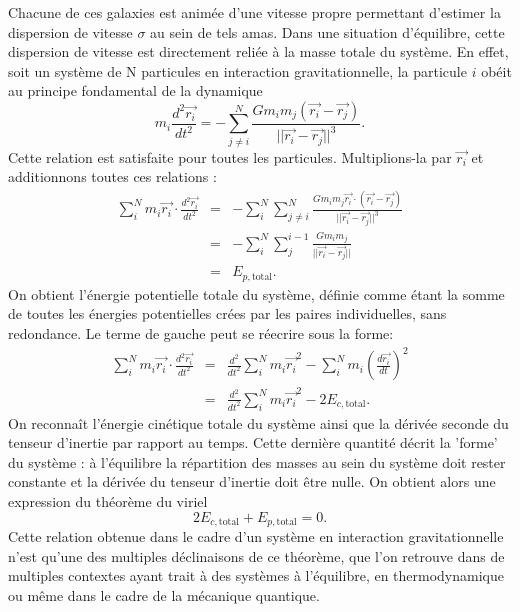 Chacune de ces galaxies est animée d'une vitesse propre permettant d'estimer la dispersion de vitesse $\sigma$ au sein de tels amas. Dans une situation d'équilibre, cette dispersion de vitesse est directement reliée à la masse totale du système. En effet, soit un système de N particules en interaction gravitationnelle, la particule $i$ obéit au principe fondamental de la dynamique
\begin{equation}
m_i\frac{d^2 \vec{r_i}}{dt^2}=-\sum_{j\neq i}^N \frac{Gm_i m_j (\vec{r_i}-\vec{r_j})}{||\vec{r_i}-\vec{r_j}||^3}.
\end{equation}
Cette relation est satisfaite pour toutes les particules. Multiplions-la par $\vec{r_i}$ et additionnons toutes ces relations :
\begin{eqnarray}
\sum_i^N m_i\vec{r_i}\cdot\frac{d^2 \vec{r_i}}{dt^2}&=&-\sum_i^N \sum_{j\neq i}^N \frac{Gm_i m_j \vec{r_i}\cdot (\vec{r_i}-\vec{r_j})}{||\vec{r_i}-\vec{r_j}||^3}\\
&=& -\sum_i^N \sum_j^{i-1}\frac{Gm_i m_j}{||\vec{r_i}-\vec{r_j}||}\\
&=&E_{p,\mathrm{total}}.
\end{eqnarray}
On obtient l'énergie potentielle totale du système, définie comme étant la somme de toutes les énergies potentielles crées par les paires individuelles, sans redondance. Le terme de gauche peut se réecrire sous la forme:
\begin{eqnarray}
\sum_i^N m_i\vec{r_i}\cdot\frac{d^2 \vec{r_i}}{dt^2}&=&\frac{d^2}{dt^2}\sum_i^N m_i \vec{r_i}^2 - \sum_i^N m_i \left(\frac{d \vec{r_i}}{dt}\right)^2\\
&=&\frac{d^2}{dt^2}\sum_i^N m_i \vec{r_i}^2 - 2E_{c,\mathrm{total}}.
\end{eqnarray}
On reconnaît l'énergie cinétique totale du système ainsi que la dérivée seconde du tenseur d'inertie par rapport au temps. Cette dernière quantité décrit la 'forme' du système : à l'équilibre la répartition des masses au sein du système doit rester constante et la dérivée du tenseur d'inertie doit être nulle. On obtient alors une expression du théorème du viriel
\begin{equation}
2E_{c,\mathrm{total}} + E_{p,\mathrm{total}} =0.
\end{equation}
Cette relation obtenue dans le cadre d'un système en interaction gravitationnelle n'est qu'une des multiples déclinaisons de ce théorème, que l'on retrouve dans de multiples contextes ayant trait à des systèmes à l'équilibre, en thermodynamique ou même dans le cadre de la mécanique quantique.

